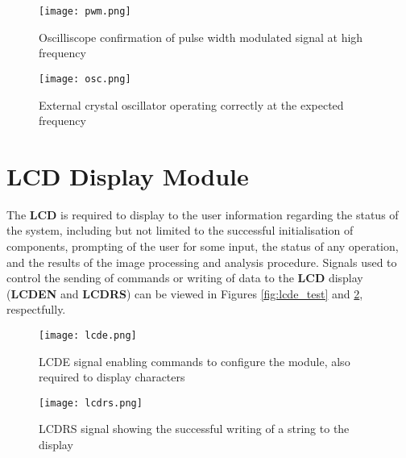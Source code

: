 \documentclass[11pt, a4paper, oneside]{Thesis} %
\begin{document}
\begin{figure}[htbp]
  \begin{minipage}[b]{0.5\linewidth}
    \centering
    \texttt{[image: pwm.png]}
    \caption{Oscilliscope confirmation of pulse width modulated signal at high frequency}
    \label{fig:pwm_test}
  \end{minipage}
  \hspace{0.5cm}
  \begin{minipage}[b]{0.5\linewidth}
    \centering
    \texttt{[image: osc.png]}
    \caption{External crystal oscillator operating correctly at the expected frequency}
    \label{fig:osc_test}
  \end{minipage}
\end{figure}

\section{LCD Display Module}
The \textbf{LCD} is required to display to the user information regarding the status of the system, including but not limited to the successful initialisation of components, prompting of the user for some input, the status of any operation, and the results of the image processing and analysis procedure. Signals used to control the sending of commands or writing of data to the \textbf{LCD} display (\textbf{LCDEN} and \textbf{LCDRS}) can be viewed in Figures \ref{fig:lcde_test} and \ref{fig:lcdrs_test}, respectfully.

\begin{figure}[htbp]
  \begin{minipage}[b]{0.5\linewidth}
    \centering
    \texttt{[image: lcde.png]}
    \caption{LCDE signal enabling commands to configure the module, also required to display characters}
    \label{fig:lcde_test}
  \end{minipage}
  \hspace{0.5cm}
  \begin{minipage}[b]{0.5\linewidth}
    \centering
    \texttt{[image: lcdrs.png]}
    \caption{LCDRS signal showing the successful writing of a string to the display}
    \label{fig:lcdrs_test}
  \end{minipage}
\end{figure}
\end{document}
